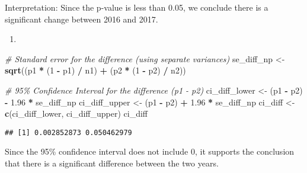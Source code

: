 \documentclass[
]{article}
\newenvironment{Shaded}{\begin{snugshade}}{\end{snugshade}}
\newcommand{\CommentTok}[1]{\textcolor[rgb]{0.56,0.35,0.01}{\textit{#1}}}
\newcommand{\DecValTok}[1]{\textcolor[rgb]{0.00,0.00,0.81}{#1}}
\newcommand{\FloatTok}[1]{\textcolor[rgb]{0.00,0.00,0.81}{#1}}
\newcommand{\FunctionTok}[1]{\textcolor[rgb]{0.13,0.29,0.53}{\textbf{#1}}}
\newcommand{\NormalTok}[1]{#1}
\newcommand{\OtherTok}[1]{\textcolor[rgb]{0.56,0.35,0.01}{#1}}
\newcommand{\SpecialCharTok}[1]{\textcolor[rgb]{0.81,0.36,0.00}{\textbf{#1}}}
\providecommand{\tightlist}{%
  \setlength{\itemsep}{0pt}\setlength{\parskip}{0pt}}
\begin{document}
Interpretation: Since the p-value is less than 0.05, we conclude there
is a significant change between 2016 and 2017.

\begin{enumerate}
\def\labelenumi{(\alph{enumi})}
\setcounter{enumi}{1}
\tightlist
\item
\end{enumerate}

\begin{Shaded}
\begin{Highlighting}[]
\CommentTok{\# Standard error for the difference (using separate variances)}
\NormalTok{se\_diff\_np }\OtherTok{\textless{}{-}} \FunctionTok{sqrt}\NormalTok{((p1 }\SpecialCharTok{*}\NormalTok{ (}\DecValTok{1} \SpecialCharTok{{-}}\NormalTok{ p1) }\SpecialCharTok{/}\NormalTok{ n1) }\SpecialCharTok{+}\NormalTok{ (p2 }\SpecialCharTok{*}\NormalTok{ (}\DecValTok{1} \SpecialCharTok{{-}}\NormalTok{ p2) }\SpecialCharTok{/}\NormalTok{ n2))}

\CommentTok{\# 95\% Confidence Interval for the difference (p1 {-} p2)}
\NormalTok{ci\_diff\_lower }\OtherTok{\textless{}{-}}\NormalTok{ (p1 }\SpecialCharTok{{-}}\NormalTok{ p2) }\SpecialCharTok{{-}} \FloatTok{1.96} \SpecialCharTok{*}\NormalTok{ se\_diff\_np}
\NormalTok{ci\_diff\_upper }\OtherTok{\textless{}{-}}\NormalTok{ (p1 }\SpecialCharTok{{-}}\NormalTok{ p2) }\SpecialCharTok{+} \FloatTok{1.96} \SpecialCharTok{*}\NormalTok{ se\_diff\_np}
\NormalTok{ci\_diff }\OtherTok{\textless{}{-}} \FunctionTok{c}\NormalTok{(ci\_diff\_lower, ci\_diff\_upper)}
\NormalTok{ci\_diff}
\end{Highlighting}
\end{Shaded}

\begin{verbatim}
## [1] 0.002852873 0.050462979
\end{verbatim}

Since the 95\% confidence interval does not include 0, it supports the
conclusion that there is a significant difference between the two years.
\end{document}
